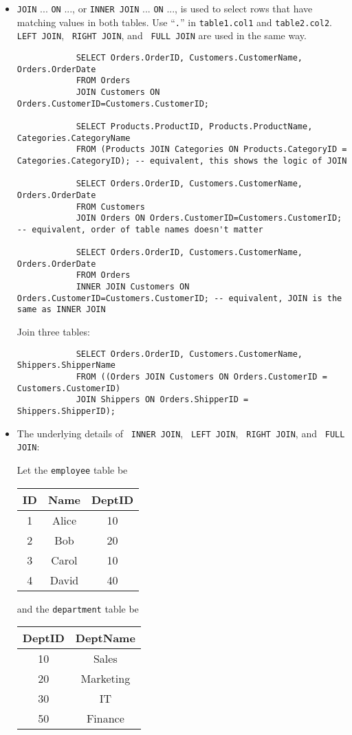 \documentclass{article}
\begin{document}
	\begin{itemize}
		\item \texttt{\color{red}JOIN} ... \texttt{\color{red}ON} ..., or \texttt{\color{red}INNER JOIN} ... \texttt{\color{red}ON} ..., is used to select rows that have matching values in both tables. Use ``\texttt{\color{red}.}'' in \texttt{table1.col1} and \texttt{table2.col2}. \texttt{\color{red} LEFT JOIN}, \texttt{\color{red} RIGHT JOIN}, and \texttt{\color{red} FULL JOIN} are used in the same way.
		
		\begin{lstlisting}
			SELECT Orders.OrderID, Customers.CustomerName, Orders.OrderDate
			FROM Orders
			JOIN Customers ON Orders.CustomerID=Customers.CustomerID;
			
			SELECT Products.ProductID, Products.ProductName, Categories.CategoryName
			FROM (Products JOIN Categories ON Products.CategoryID = Categories.CategoryID); -- equivalent, this shows the logic of JOIN
			
			SELECT Orders.OrderID, Customers.CustomerName, Orders.OrderDate
			FROM Customers
			JOIN Orders ON Orders.CustomerID=Customers.CustomerID; -- equivalent, order of table names doesn't matter
			
			SELECT Orders.OrderID, Customers.CustomerName, Orders.OrderDate
			FROM Orders
			INNER JOIN Customers ON Orders.CustomerID=Customers.CustomerID; -- equivalent, JOIN is the same as INNER JOIN
		\end{lstlisting}
		
		Join three tables:
		\begin{lstlisting}
			SELECT Orders.OrderID, Customers.CustomerName, Shippers.ShipperName
			FROM ((Orders JOIN Customers ON Orders.CustomerID = Customers.CustomerID)
			JOIN Shippers ON Orders.ShipperID = Shippers.ShipperID);
		\end{lstlisting}
		
		\item The underlying details of \texttt{\color{red} INNER JOIN}, \texttt{\color{red} LEFT JOIN}, \texttt{\color{red} RIGHT JOIN}, and \texttt{\color{red} FULL JOIN}:
		
		Let the \texttt{employee} table be
		\begin{tabular}{|c|c|c|}
			ID & Name  & DeptID\\
			\hline
			1  & Alice & 10\\
			2  & Bob   & 20\\
			3  & Carol & 10\\
			4  & David & 40
		\end{tabular} and the \texttt{department} table be
		\begin{tabular}{|c|c|}
			DeptID & DeptName\\
			\hline
			10 & Sales\\
			20 & Marketing\\
			30 & IT\\
			50 & Finance
		\end{tabular}
		

\end{itemize}
\end{document}
